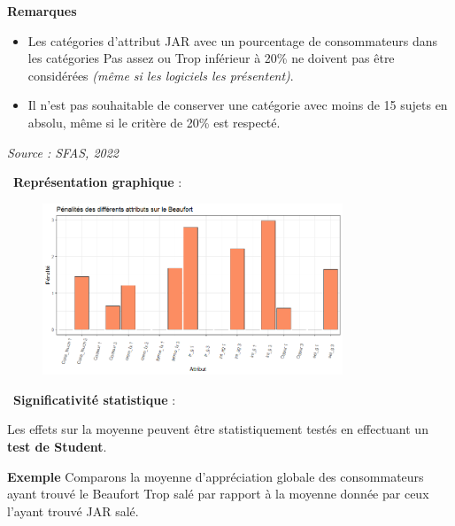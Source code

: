 \documentclass[aspectratio=169,xcolor=dvipsnames]{beamer}
\begin{document}
\begin{frame}
	\begin{exampleblock}{\textbf{Remarques}}
		\begin{itemize}
		\item Les catégories d’attribut JAR avec un pourcentage de consommateurs dans les catégories \og Pas assez \fg{}  ou \og Trop \fg{} inférieur à 20\% ne doivent pas être considérées \emph{(même si les logiciels les présentent)}.
		\item Il n'est pas souhaitable de conserver une catégorie avec moins de 15 sujets en absolu, même si le critère de 20\% est respecté.
		\end{itemize}
	\emph{Source : SFAS, 2022}
	\end{exampleblock}
\end{frame}

\begin{frame}

\textcolor{nyubluedarker}{\faChartBar \ \textbf{Représentation graphique} :}

	\begin{figure}
	\centering
	\includegraphics[width = 0.8\textwidth]{penalites_beaufort.png}
	\end{figure}

\end{frame}

\begin{frame}

\textcolor{nyubluedarker}{\faCogs \ \textbf{Significativité statistique} :}

Les effets sur la moyenne peuvent être statistiquement testés en effectuant un \textbf{test de Student}.

\medskip

	\begin{exampleblock}{\textbf{Exemple}}
	Comparons la moyenne d'appréciation globale des consommateurs ayant trouvé le Beaufort \og Trop salé \fg{} par rapport à la moyenne donnée par ceux l'ayant trouvé \og JAR \fg{} salé.
	\end{exampleblock}
\end{frame}
\end{document}
